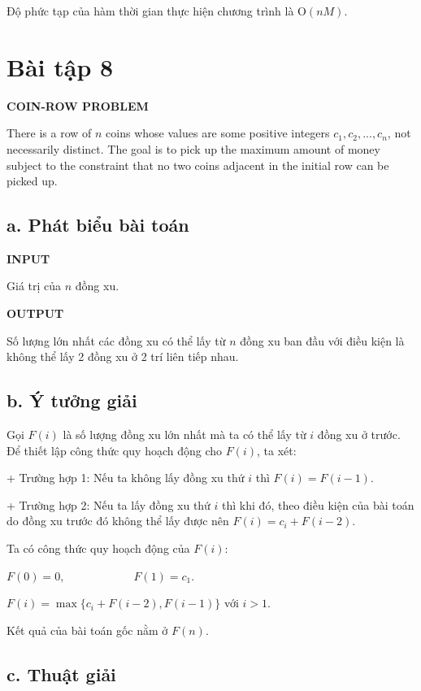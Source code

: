 \documentclass[12pt, a4paper, fleqn]{article}
\begin{document}
	Độ phức tạp của hàm thời gian thực hiện chương trình là O$(nM)$.
	
	\clearpage
	
	\section*{Bài tập 8}
	
	
	\textbf{COIN-ROW PROBLEM}
	
	There is a row of $n$ coins whose values are some positive integers $c_1, c_2, ..., c_n$, not necessarily distinct. The goal is to pick up the maximum amount of money subject to the constraint that no two coins adjacent in the initial row can be picked up.
	
	\subsection*{a. Phát biểu bài toán}
	
	\textbf{INPUT}
	
	Giá trị của $n$ đồng xu.
	
	\textbf{OUTPUT}
	
	Số lượng lớn nhất các đồng xu có thể lấy từ $n$ đồng xu ban đầu với điều kiện là không thể lấy 2 đồng xu ở 2 trí liên tiếp nhau.
	
	\subsection*{b. Ý tưởng giải}
	
	Gọi $F(i)$ là số lượng đồng xu lớn nhất mà ta có thể lấy từ $i$ đồng xu ở trước. Để thiết lập công thức quy hoạch động cho $F(i)$, ta xét:
	
	+ Trường hợp 1: Nếu ta không lấy đồng xu thứ $i$ thì $F(i) = F(i - 1)$.
	
	+ Trường hợp 2: Nếu ta lấy đồng xu thứ $i$ thì khi đó, theo điều kiện của bài toán do đồng xu trước đó không thể lấy được nên $F(i) = c_i + F(i - 2)$.
	
	Ta có công thức quy hoạch động của $F(i)$:
	
	$F(0) = 0, \qquad \qquad \qquad F(1) = c_1$.
	
	$F(i) = \max\{c_i + F(i - 2), F(i - 1)\}$ với $i > 1$.
	
	Kết quả của bài toán gốc nằm ở $F(n)$.
	
	\subsection*{c. Thuật giải}
	
\end{document}
